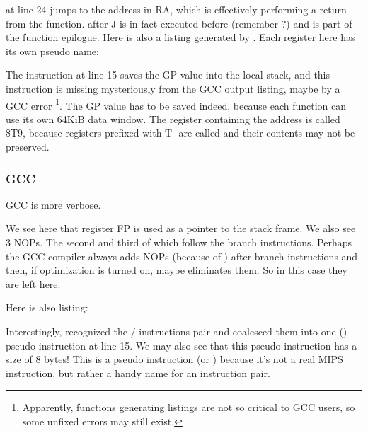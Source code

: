 
 at line 24 jumps to the address in \ac{RA}, which is effectively performing a return from the function.
 after J is in fact executed before  (remember ?) and is part of the function epilogue.
Here is also a listing generated by \IDA. Each register here has its own pseudo name:



The instruction at line 15 saves the GP value into the local stack, and this instruction is missing mysteriously from the GCC output listing, maybe by a GCC error
\footnote{Apparently, functions generating listings are not so critical to GCC users, so some unfixed errors may still exist.}.
The GP value has to be saved indeed, because each function can use its own 64KiB data window.
The register containing the \puts address is called \$T9, because registers prefixed with T- are called
 and their contents may not be preserved.

\subsubsection{\NonOptimizing GCC}

\NonOptimizing GCC is more verbose.



We see here that register FP is used as a pointer to the stack frame.
We also see 3 \ac{NOP}s.
The second and third of which follow the branch instructions.
Perhaps the GCC compiler always adds \ac{NOP}s (because of ) after branch
instructions and then, if optimization is turned on, maybe eliminates them.
So in this case they are left here.

Here is also \IDA listing:




Interestingly, \IDA recognized the / instructions pair and coalesced them into one 
 () pseudo instruction at line 15.
We may also see that this pseudo instruction has a size of 8 bytes!
This is a pseudo instruction (or ) because it's not a real MIPS instruction, but rather
a handy name for an instruction pair.


